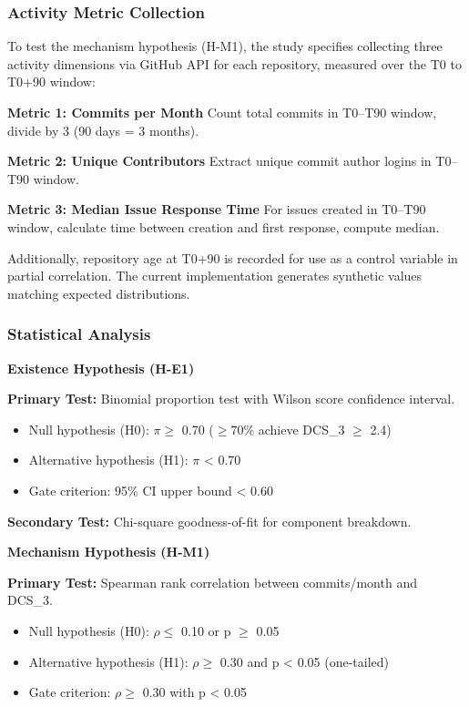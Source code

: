 \subsubsection{Activity Metric Collection}

To test the mechanism hypothesis (H-M1), the study specifies collecting three activity dimensions via GitHub API for each repository, measured over the T0 to T0+90 window:

\textbf{Metric 1: Commits per Month}  
Count total commits in T0--T90 window, divide by 3 (90 days = 3 months).

\textbf{Metric 2: Unique Contributors}  
Extract unique commit author logins in T0--T90 window.

\textbf{Metric 3: Median Issue Response Time}  
For issues created in T0--T90 window, calculate time between creation and first response, compute median.

Additionally, repository age at T0+90 is recorded for use as a control variable in partial correlation. The current implementation generates synthetic values matching expected distributions.

\subsubsection{Statistical Analysis}

\textbf{Existence Hypothesis (H-E1)}

\textbf{Primary Test:} Binomial proportion test with Wilson score confidence interval.  
\begin{itemize}
\item Null hypothesis (H0): $\pi \geq$ 0.70 ($\geq 70$\% achieve DCS\_3 $\geq$ 2.4)
\item Alternative hypothesis (H1): $\pi$ < 0.70
\item Gate criterion: 95\% CI upper bound < 0.60
\end{itemize}

\textbf{Secondary Test:} Chi-square goodness-of-fit for component breakdown.

\textbf{Mechanism Hypothesis (H-M1)}

\textbf{Primary Test:} Spearman rank correlation between commits/month and DCS\_3.  
\begin{itemize}
\item Null hypothesis (H0): $\rho \leq$ 0.10 or p $\geq$ 0.05
\item Alternative hypothesis (H1): $\rho \geq$ 0.30 and p < 0.05 (one-tailed)
\item Gate criterion: $\rho \geq$ 0.30 with p < 0.05
\end{itemize}

